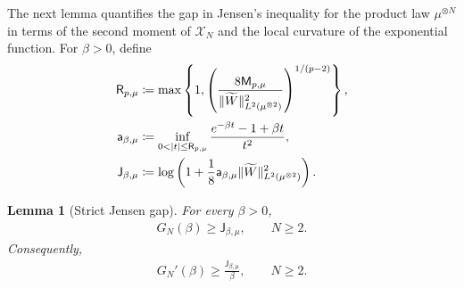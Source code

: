 \documentclass[11pt,reqno]{amsart}
\numberwithin{equation}{section}
\theoremstyle{plain}
\newtheorem{lemma}[lemma]{Lemma}
\theoremstyle{remark}
\DeclarePairedDelimiter{\norm}{\lVert}{\rVert}
\newcommand{\tl}{\widetilde}
\newcommand{\be}{\beta}
\begin{document}
The next lemma quantifies the gap in Jensen's inequality for the product law
\(\mu^{\otimes N}\) in terms of the second moment of \(\mathcal X_N\) and the
local curvature of the exponential function.  For \(\be>0\), define
\begin{align}
 \mathsf R_{p,\mu}
 &\coloneqq
 \max\left\{1,
 \left(\frac{8\mathsf M_{p,\mu}}
 {\norm{\tl W}_{L^2(\mu^{\otimes2})}^2}\right)^{1/(p-2)}\right\},
 \label{eq:jensen-cutoff-def}\\
 \mathsf a_{\be,\mu}
 &\coloneqq
 \inf_{0<|t|\le\mathsf R_{p,\mu}}
 \frac{e^{-\be t}-1+\be t}{t^2},
 \label{eq:jensen-curvature-def}\\
 \mathsf J_{\be,\mu}
 &\coloneqq
 \log\left(1+\frac18\mathsf a_{\be,\mu}
 \norm{\tl W}_{L^2(\mu^{\otimes2})}^2\right).
 \label{eq:jensen-gap-constant-def}
\end{align}

\begin{lemma}[Strict Jensen gap]\label{lem:jensen-gap}
For every \(\be>0\),
\begin{align}\label{eq:jensen-gap}
 G_N(\be)\ge \mathsf J_{\be,\mu},
 \qquad N\ge2.
\end{align}
Consequently,
\begin{align}\label{eq:GN-derivative-lower}
 G_N'(\be)\ge \frac{\mathsf J_{\be,\mu}}{\be},
 \qquad N\ge2.
\end{align}
\end{lemma}
\end{document}

